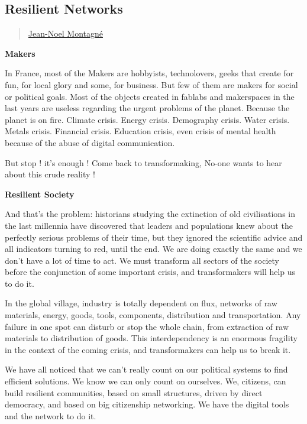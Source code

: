 \subsection{Resilient Networks}\label{resilient-networks}

\begin{quote}
\href{../appendix/attributions.html\#jean-noel-montagne}{Jean-Noel
Montagné}
\end{quote}

\textbf{Makers}

In France, most of the Makers are hobbyists, technolovers, geeks that
create for fun, for local glory and some, for business. But few of them
are makers for social or political goals. Most of the objects created in
fablabs and makerspaces in the last years are useless regarding the
urgent problems of the planet. Because the planet is on fire. Climate
crisis. Energy crisis. Demography crisis. Water crisis. Metals crisis.
Financial crisis. Education crisis, even crisis of mental health because
of the abuse of digital communication.

But stop ! it's enough ! Come back to transformaking, No-one wants to
hear about this crude reality !

\textbf{Resilient Society}

And that's the problem: historians studying the extinction of old
civilisations in the last millennia have discovered that leaders and
populations knew about the perfectly serious problems of their time, but
they ignored the scientific advice and all indicators turning to red,
until the end. We are doing exactly the same and we don't have a lot of
time to act. We must transform all sectors of the society before the
conjunction of some important crisis, and transformakers will help us to
do it.

In the global village, industry is totally dependent on flux, networks
of raw materials, energy, goods, tools, components, distribution and
transportation. Any failure in one spot can disturb or stop the whole
chain, from extraction of raw materials to distribution of goods. This
interdependency is an enormous fragility in the context of the coming
crisis, and transformakers can help us to break it.

We have all noticed that we can't really count on our political systems
to find efficient solutions. We know we can only count on ourselves. We,
citizens, can build resilient communities, based on small structures,
driven by direct democracy, and based on big citizenship networking. We
have the digital tools and the network to do it.

